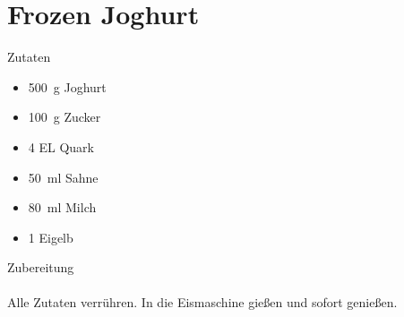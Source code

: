 \section*{Frozen Joghurt}
\ihead{}\ohead{}
\cfoot{}
{\Large Zutaten}
\begin{multicols}{2}
\begin{itemize}
    \item \SI{500}{g} Joghurt
    \item \SI{100}{g} Zucker
    \item \num{4} EL Quark
    \item \SI{50}{ml} Sahne
    \item \SI{80}{ml} Milch
    \item \num{1} Eigelb
\end{itemize}
\end{multicols}
\noindent
{\Large Zubereitung}\\
\\
Alle Zutaten verrühren. 
In die Eismaschine gießen und sofort genießen.
